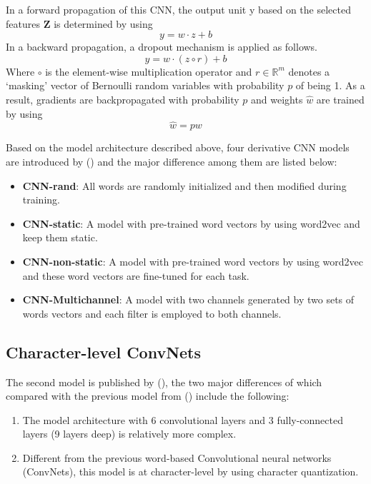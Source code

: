 \documentclass[]{krantz}
\providecommand{\tightlist}{%
  \setlength{\itemsep}{0pt}\setlength{\parskip}{0pt}}
\begin{document}
In a forward propagation of this CNN, the output unit y based on the selected features \(\boldsymbol{Z}\) is determined by using
\[y=w \cdot z+b\]
In a backward propagation, a dropout mechanism is applied as follows.
\[y=w \cdot (z \circ r)+b\]
Where \(\circ\) is the element-wise multiplication operator and \(r \in \mathbb{R}^{m}\) denotes a `masking' vector of Bernoulli random variables with probability \(p\) of being 1. As a result, gradients are backpropagated with probability \(p\) and weights \(\hat{w}\) are trained by using
\[\hat{w}=pw\]

Based on the model architecture described above, four derivative CNN models are introduced by (\citet{Kim2014ConvolutionalNN}) and the major difference among them are listed below:

\begin{itemize}
\tightlist
\item
  \textbf{CNN-rand}: All words are randomly initialized and then modified during training.
\item
  \textbf{CNN-static}: A model with pre-trained word vectors by using word2vec and keep them static.
\item
  \textbf{CNN-non-static}: A model with pre-trained word vectors by using word2vec and these word vectors are fine-tuned for each task.
\item
  \textbf{CNN-Multichannel}: A model with two channels generated by two sets of words vectors and each filter is employed to both channels.
\end{itemize}

\hypertarget{character-level-convnets}{%
\subsection{Character-level ConvNets}\label{character-level-convnets}}

The second model is published by (\citet{Zhang2015CharacterlevelCN}), the two major differences of which compared with the previous model from (\citet{Kim2014ConvolutionalNN}) include the following:

\begin{enumerate}
\def\labelenumi{\arabic{enumi}.}
\tightlist
\item
  The model architecture with 6 convolutional layers and 3 fully-connected layers (9 layers deep) is relatively more complex.
\item
  Different from the previous word-based Convolutional neural networks (ConvNets), this model is at character-level by using character quantization.
\end{enumerate}
\end{document}
